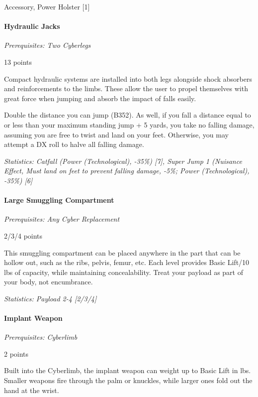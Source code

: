 \begin{multicols*}{3}
	Accessory, Power Holster [1]
	
	\paragraph{Hydraulic Jacks}
	\textit{Prerequisites: Two Cyberlegs}
	\begin{flushright}
		13 points
	\end{flushright}
	
	Compact hydraulic systems are installed into both legs alongside shock absorbers and reinforcements to the limbs. These  allow the user to propel themselves with great force when jumping and absorb the impact of falls easily.
	
	Double the distance you can jump (B352). As well, if you fall a distance equal to or less than your maximum standing jump + 5 yards, you take no falling damage, assuming you are free to twist and land on your feet. Otherwise, you may attempt a DX roll to halve all falling damage.
	
	\textit{\textcolor{OliveGreen}{Statistics: Catfall (Power (Technological), -35\%) [7], Super Jump 1 (Nuisance Effect, Must land on feet to prevent falling damage, -5\%; Power (Technological), -35\%) [6]}}
	
	\paragraph{Large Smuggling Compartment}
	\textit{Prerequisites: Any Cyber Replacement}
	\begin{flushright}
		2/3/4 points
	\end{flushright}
	
	This smuggling compartment can be placed anywhere in the part that can be hollow out, such as the ribs, pelvis, femur, etc. Each level provides Basic Lift/10 lbs of capacity, while maintaining concealability. Treat your payload as part of your body, not encumbrance. 
	
	\textit{\textcolor{OliveGreen}{Statistics: Payload 2-4 [2/3/4]}}
	
	\paragraph{Implant Weapon}
	\textit{Prerequisites: Cyberlimb}
	\begin{flushright}
		2 points
	\end{flushright}
	
	Built into the Cyberlimb, the implant weapon can weight up to Basic Lift in lbs. Smaller weapons fire through the palm or knuckles, while larger ones fold out the hand at the wrist.
	

\end{multicols*}
